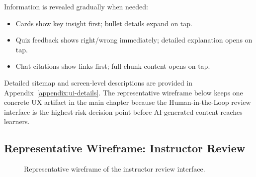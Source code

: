 Information is revealed gradually when needed:

\begin{itemize}
    \item Cards show key insight first; bullet details expand on tap.
    \item Quiz feedback shows right/wrong immediately; detailed
          explanation opens on tap.
    \item Chat citations show links first; full chunk content opens on tap.
\end{itemize}

Detailed sitemap and screen-level descriptions are provided in
Appendix~\ref{appendix:ui-details}. The representative wireframe below
keeps one concrete UX artifact in the main chapter because the
Human-in-the-Loop review interface is the highest-risk decision point
before AI-generated content reaches learners.

\subsection{Representative Wireframe: Instructor Review}
\label{subsec:representative-wireframe}

\begin{figure}[H]
    \centering
    \caption{Representative wireframe of the instructor review interface.}
    \label{fig:wireframe-review-interface}
\end{figure}

